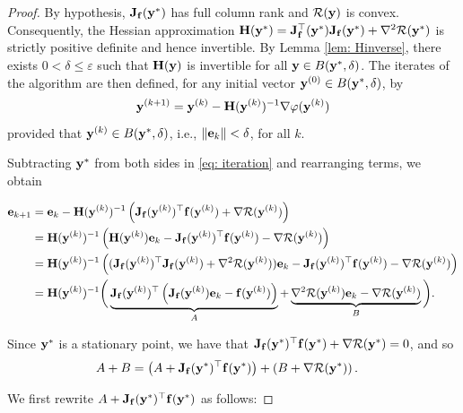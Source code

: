 \documentclass[onefignum,onetabnum]{siamart171218}
\newcommand{\bH}{{\bf H}}
\newcommand{\bJ}{{\bf J}}
\newcommand{\be}{{\bf e}}
\newcommand{\bff}{{\bf f}}
\newcommand{\by}{{\bf y}}
\begin{document}
\begin{proof} 
By hypothesis, $\bJ_{\bf f}(\by^*)$ has full column rank and $\mathcal{R}(\by)$ is convex. Consequently, the Hessian approximation $\bH(\by^*) =\bJ^\top_{\mathbf{f}} (\by^*) \bJ_{\mathbf{f}}(\by^*) + \nabla^2 \mathcal{R}(\by^*)$
is strictly positive definite and hence invertible. By Lemma \ref{lem: Hinverse}, there exists $0 < \delta \le \varepsilon$ such that $\bH(\by)$ is invertible for all $\by \in B(\by^*,\delta)$. The iterates of the algorithm are then defined, for any initial vector $\by^{(0)} \in B(\by^*,\delta)$, by
\begin{equation}\label{eq: iteration}
\by^{(k+1)} = \by^{(k)} - 
\bH(\by^{(k)})^{-1}
\nabla \varphi(\by^{(k)})
\end{equation}
provided that $\by^{(k)}\in B(\by^*,\delta)$, i.e., $\|\be_k\|<\delta $, for all $k$.

Subtracting $\by^*$ from both sides in \eqref{eq: iteration} and rearranging terms, we obtain
\begin{small}
\begin{align*}
    \be_{k+1} &= \be_k - \bH(\by^{(k)})^{-1} \left( \bJ_{\bf f}(\by^{(k)})^\top \bff(\by^{(k)}) + \nabla \mathcal{R}(\by^{(k)}) \right) \\
    &= \bH(\by^{(k)})^{-1} \left( \bH(\by^{(k)})\be_k - \bJ_{\bf f}(\by^{(k)})^\top \bff(\by^{(k)}) - \nabla \mathcal{R}(\by^{(k)}) \right) \\
    &= \bH(\by^{(k)})^{-1} \left( (\bJ_{\bf f}(\by^{(k)})^\top \bJ_{\bf f}(\by^{(k)}) + \nabla^2 \mathcal{R}(\by^{(k)}))\be_k - \bJ_{\bf f}(\by^{(k)})^\top \bff(\by^{(k)}) - \nabla \mathcal{R}(\by^{(k)}) \right) \\
    &= \bH(\by^{(k)})^{-1} \bigg(
    \underbrace{\bJ_{\bf f}(\by^{(k)})^\top \left( \bJ_{\bf f}(\by^{(k)})\be_k - \bff(\by^{(k)}) \right)}_{A}
    + \underbrace{ \nabla^2 \mathcal{R}(\by^{(k)})\be_k - \nabla \mathcal{R}(\by^{(k)}) }_{B} \bigg).
\end{align*}
\end{small}


Since $\by^*$ is a stationary point, we have that
$\bJ_{\bf f}(\by^*)^\top \bff(\by^*) + \nabla \mathcal{R}(\by^*) = 0$, and
so
\begin{align*}
A+ B &= \left(A+\bJ_{\bf f}(\by^*)^\top \bff(\by^*) \right)+ \left(B+\nabla \mathcal{R}(\by^*) \right).
\end{align*}

We first rewrite $A+\bJ_{\bf f}(\by^*)^\top \bff(\by^*)$ as follows:


\end{proof}
\end{document}
